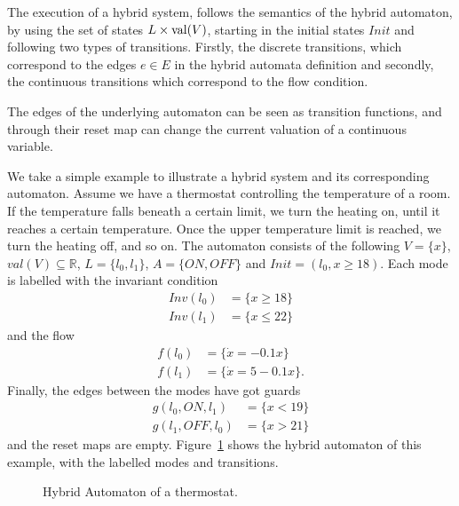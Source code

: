 The execution of a hybrid system, follows the semantics of the hybrid automaton, by using the set of states $L\times\operatorname{val}(V)$, starting in the initial states $Init$ and following two types of transitions. Firstly, the discrete transitions, which correspond to the edges $e\in E$ in the hybrid automata definition and secondly, the continuous transitions which correspond to the flow condition.

\begin{rem}
The edges of the underlying automaton can be seen as transition functions, and through their reset map can change the current valuation of a continuous variable.
\end{rem}

\begin{ex}
We take a simple example to illustrate a hybrid system and its corresponding automaton. Assume we have a thermostat controlling the temperature of a room. If the temperature falls beneath a certain limit, we turn the heating on, until it reaches a certain temperature. Once the upper temperature limit is reached, we turn the heating off, and so on. The automaton consists of the following $V=\{x\}$, $val(V)\subseteq\mathbb{R}$, $L=\{l_{0},l_{1}\}$, $A=\{ON,OFF\}$ and $Init=(l_{0},x\geq18)$. Each mode is labelled with the invariant condition
\begin{align*}
    Inv(l_{0}) & = \{x\geq18\} \\
    Inv(l_{1}) & = \{x\leq22\}
\end{align*}
and the flow
\begin{align*}
    f(l_{0}) & = \{\dot{x} = -0.1x\} \\
    f(l_{1}) & = \{\dot{x} = 5-0.1x\}.
\end{align*}
Finally, the edges between the modes have got guards
\begin{align*}
    g(l_{0},ON,l_{1}) & = \{x<19\}  \\
    g(l_{1},OFF,l_{0}) & = \{x>21\}
\end{align*}
and the reset maps are empty.
Figure~\ref{fig:exthermo} shows the hybrid automaton of this example, with the labelled modes and transitions.
\begin{figure}[H]
    \begin{center}
        \caption{Hybrid Automaton of a thermostat.}
        \label{fig:exthermo}
    \end{center}
\end{figure}
\end{ex}

